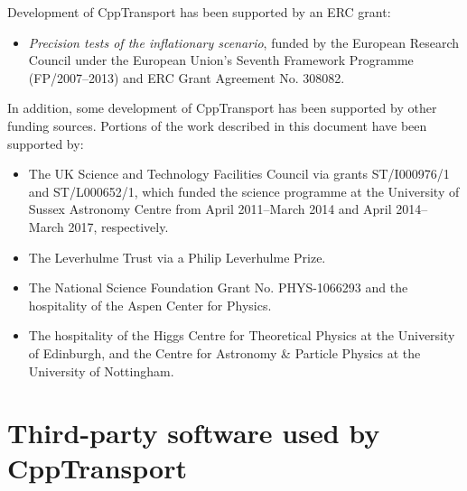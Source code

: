 \documentclass[11pt,a4paper]{article}
\newcommand{\packagefont}{\sffamily}
\newcommand{\CppTransport}{{\packagefont CppTransport}}
\begin{document}
Development of {\CppTransport} has been supported
by an ERC grant:
\begin{itemize}
    \item \emph{Precision tests of the inflationary
    scenario},
    funded by
    the European Research Council under the European Union's
    Seventh Framework Programme (FP/2007--2013) and ERC Grant Agreement No. 308082.
\end{itemize}
In addition,
some development of {\CppTransport} has been supported by
other funding sources.
Portions of
the work described in this document have been supported by:
\begin{itemize}
    \item The UK
    Science and Technology Facilities Council via grants
    ST/I000976/1 and ST/L000652/1,
    which funded the science programme at the University of Sussex Astronomy
    Centre from April 2011--March 2014
    and April 2014--March 2017, respectively.
    \item The Leverhulme Trust via a Philip Leverhulme Prize.
    \item The National Science Foundation Grant No. PHYS-1066293
    and the hospitality of the Aspen Center for Physics.
    \item The hospitality of the Higgs Centre for Theoretical
    Physics at the University of Edinburgh,
    and the Centre for Astronomy \& Particle Physics
    at the University of Nottingham.
\end{itemize}

\appendix

\section{Third-party software used by {\CppTransport}}



\end{document}
